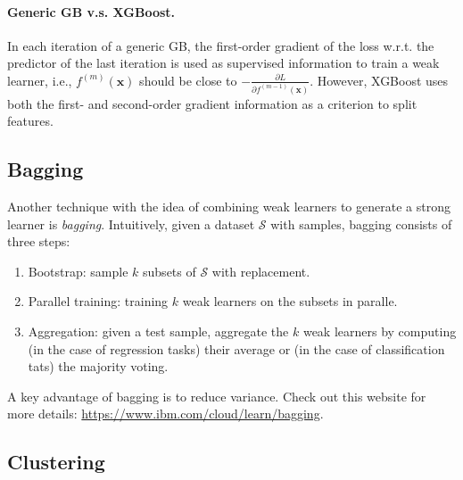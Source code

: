         
        \paragraph{Generic GB v.s. XGBoost.}
        In each iteration of a generic GB, the first-order gradient of the loss w.r.t. the predictor of the last iteration is used as supervised information to train a weak learner, i.e., $f^{(m)}(\bm{x})$ should be close to $-\frac{\partial L}{\partial f^{(m-1)}(\bm{x})}$.
        However, XGBoost uses both the first- and second-order gradient information as a criterion to split features.
        
    
    
    
\subsection{Bagging}

Another technique with the idea of combining weak learners to generate a strong learner is \emph{bagging}.
Intuitively, given a dataset $\mathcal{S}$ with \ndata samples, bagging consists of three steps:
    \begin{enumerate}
        \item Bootstrap: sample $k$ subsets of $\mathcal{S}$ with replacement. 
        \item Parallel training: training $k$ weak learners on the subsets in paralle. 
        \item Aggregation: given a test sample, aggregate the $k$ weak learners by computing (in the case of regression tasks) their average or (in the case of classification tats) the majority voting.
    \end{enumerate}
A key advantage of bagging is to reduce variance.
Check out this website for more details: \url{https://www.ibm.com/cloud/learn/bagging}.



\subsection{Clustering}
